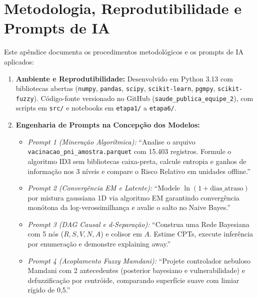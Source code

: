 \documentclass[12pt]{article}
\begin{document}
\section{Metodologia, Reprodutibilidade e Prompts de IA}
{\footnotesize
Este apêndice documenta os procedimentos metodológicos e os prompts de IA aplicados:
\begin{enumerate}[nosep,leftmargin=1.1em]
\item \textbf{Ambiente e Reprodutibilidade:} Desenvolvido em Python 3.13 com bibliotecas abertas (\texttt{numpy}, \texttt{pandas}, \texttt{scipy}, \texttt{scikit-learn}, \texttt{pgmpy}, \texttt{scikit-fuzzy}). Código-fonte versionado no GitHub (\texttt{saude\_publica\_equipe\_2}), com scripts em \texttt{src/} e notebooks em \texttt{etapa1/} a \texttt{etapa6/}.
\item \textbf{Engenharia de Prompts na Concepção dos Modelos:}
\begin{itemize}[nosep,leftmargin=1.1em]
\item \textit{Prompt 1 (Mineração Algorítmica):} ``Analise o arquivo \texttt{vacinacao\_pni\_amostra.parquet} com 15.403 registros. Formule o algoritmo ID3 sem bibliotecas caixa-preta, calcule entropia e ganhos de informação nos 3 níveis e compare o Risco Relativo em unidades offline.''
\item \textit{Prompt 2 (Convergência EM e Latente):} ``Modele $\ln(1 + \text{dias\_atraso})$ por mistura gaussiana 1D via algoritmo EM garantindo convergência monótona da log-verossimilhança e avalie o salto no Naive Bayes.''
\item \textit{Prompt 3 (DAG Causal e d-Separação):} ``Construa uma Rede Bayesiana com 5 nós ($R, S, V, N, A$) e colisor em $A$. Estime CPTs, execute inferência por enumeração e demonstre explaining away.''
\item \textit{Prompt 4 (Acoplamento Fuzzy Mamdani):} ``Projete controlador nebuloso Mamdani com 2 antecedentes (posterior bayesiano e vulnerabilidade) e defuzzificação por centróide, comparando superfície suave com limiar rígido de 0,5.''
\end{itemize}
\end{enumerate}
}
\end{document}
